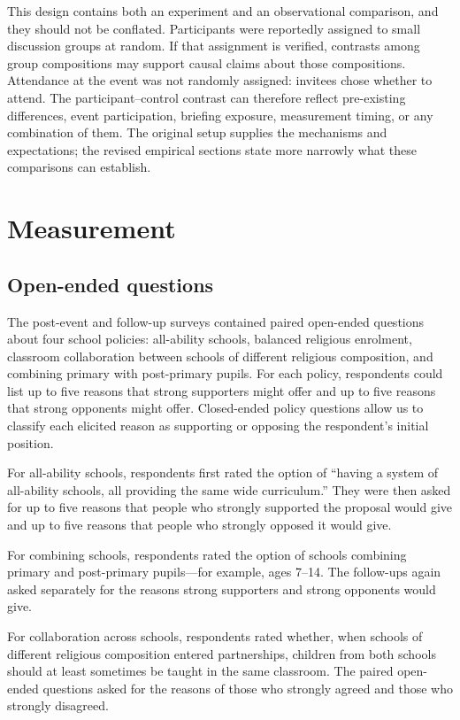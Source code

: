 \documentclass{article}
\begin{document}
This design contains both an experiment and an observational comparison, and they should not
be conflated. Participants were reportedly assigned to small discussion groups at random. If
that assignment is verified, contrasts among group compositions may support causal claims
about those compositions. Attendance at the event was not randomly assigned: invitees chose
whether to attend. The participant--control contrast can therefore reflect pre-existing
differences, event participation, briefing exposure, measurement timing, or any combination of
them. The original setup supplies the mechanisms and expectations; the revised empirical
sections state more narrowly what these comparisons can establish.

\section{Measurement}

\subsection{Open-ended questions}

The post-event and follow-up surveys contained paired open-ended questions about four school
policies: all-ability schools, balanced religious enrolment, classroom collaboration between
schools of different religious composition, and combining primary with post-primary pupils.
For each policy, respondents could list up to five reasons that strong supporters might offer
and up to five reasons that strong opponents might offer. Closed-ended policy questions allow
us to classify each elicited reason as supporting or opposing the respondent's initial position.

For all-ability schools, respondents first rated the option of ``having a system of all-ability
schools, all providing the same wide curriculum.'' They were then asked for up to five reasons
that people who strongly supported the proposal would give and up to five reasons that people
who strongly opposed it would give.

For combining schools, respondents rated the option of schools combining primary and
post-primary pupils---for example, ages 7--14. The follow-ups again asked separately for the
reasons strong supporters and strong opponents would give.

For collaboration across schools, respondents rated whether, when schools of different
religious composition entered partnerships, children from both schools should at least
sometimes be taught in the same classroom. The paired open-ended questions asked for the
reasons of those who strongly agreed and those who strongly disagreed.
\end{document}
